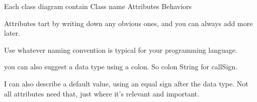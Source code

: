 Each class diagram contain 
  Class name 
  Attributes 
  Behaviors

Attributes 
  tart by writing down any obvious ones, and you can always add more later.

  Use whatever naming convention is typical for your programming language. 

  you can also suggest a data type using a colon. So colon String for callSign.
  
  I can also describe a default value, using an equal sign after the data type.
   Not all attributes need that, just where it's relevant and important. 
